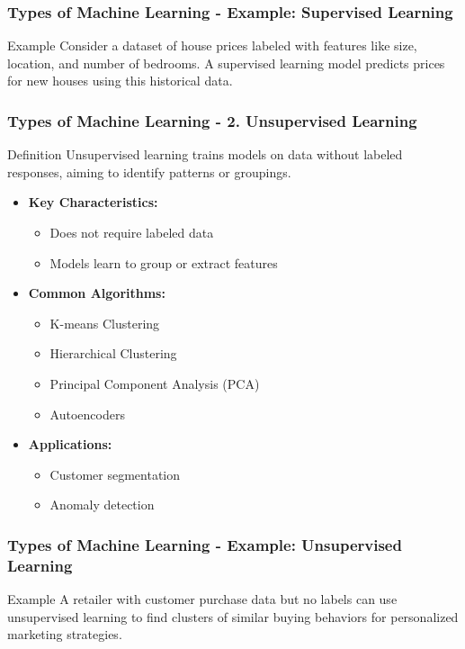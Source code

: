 \documentclass[aspectratio=169]{beamer}
\begin{document}
\begin{frame}[fragile]
    \frametitle{Types of Machine Learning - Example: Supervised Learning}
    \begin{block}{Example}
        Consider a dataset of house prices labeled with features like size, location, and number of bedrooms. 
        A supervised learning model predicts prices for new houses using this historical data.
    \end{block}
\end{frame}

\begin{frame}[fragile]
    \frametitle{Types of Machine Learning - 2. Unsupervised Learning}
    \begin{block}{Definition}
        Unsupervised learning trains models on data without labeled responses, aiming to identify patterns or groupings.
    \end{block}
    
    \begin{itemize}
        \item \textbf{Key Characteristics:}
        \begin{itemize}
            \item Does not require labeled data
            \item Models learn to group or extract features
        \end{itemize}
        \item \textbf{Common Algorithms:}
        \begin{itemize}
            \item K-means Clustering
            \item Hierarchical Clustering
            \item Principal Component Analysis (PCA)
            \item Autoencoders
        \end{itemize}
        \item \textbf{Applications:}
        \begin{itemize}
            \item Customer segmentation
            \item Anomaly detection
        \end{itemize}
    \end{itemize}
\end{frame}

\begin{frame}[fragile]
    \frametitle{Types of Machine Learning - Example: Unsupervised Learning}
    \begin{block}{Example}
        A retailer with customer purchase data but no labels can use unsupervised learning to find clusters of similar buying behaviors for personalized marketing strategies.
    \end{block}
\end{frame}
\end{document}
